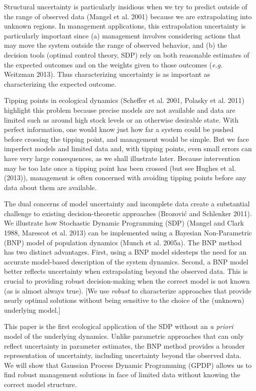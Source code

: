 \documentclass[author-year, 12pt,review]{components/elsarticle} %
\begin{document}
Structural uncertainty is particularly insidious when we try to predict
outside of the range of observed data (Mangel et al. 2001) because we
are extrapolating into unknown regions. In management applications, this
extrapolation uncertainty is particularly important since (a) management
involves considering actions that may move the system outside the range
of observed behavior, and (b) the decision tools (optimal control
theory, SDP) rely on both reasonable estimates of the expected outcomes
and on the weights given to those outcomes (\emph{e.g.} Weitzman 2013).
Thus characterizing uncertainty is as important as characterizing the
expected outcome.

Tipping points in ecological dynamics (Scheffer et al. 2001, Polasky et
al. 2011) highlight this problem because precise models are not
available and data are limited such as around high stock levels or an
otherwise desirable state. With perfect information, one would know just
how far a system could be pushed before crossing the tipping point, and
management would be simple. But we face imperfect models and limited
data and, with tipping points, even small errors can have very large
consequences, as we shall illustrate later. Because intervention may be
too late once a tipping point has been crossed (but see Hughes et al.
(2013)), management is often concerned with avoiding tipping points
before any data about them are available.

The dual concerns of model uncertainty and incomplete data create a
substantial challenge to existing decision-theoretic approaches
(Brozović and Schlenker 2011). We illustrate how Stochastic Dynamic
Programming (SDP) (Mangel and Clark 1988, Marescot et al. 2013) can be
implemented using a Bayesian Non-Parametric (BNP) model of population
dynamics (Munch et al. 2005a). The BNP method has two distinct
advantages. First, using a BNP model sidesteps the need for an accurate
model-based description of the system dynamics. Second, a BNP model
better reflects uncertainty when extrapolating beyond the observed data.
This is crucial to providing robust decision-making when the correct
model is not known (as is almost always true). {[}We use \emph{robust}
to characterize approaches that provide nearly optimal solutions without
being sensitive to the choice of the (unknown) underlying model.{]}

This paper is the first ecological application of the SDP without an
\emph{a priori} model of the underlying dynamics. Unlike parametric
approaches that can only reflect uncertainty in parameter estimates, the
BNP method provides a broader representation of uncertainty, including
uncertainty beyond the observed data. We will show that Gaussian Process
Dynamic Programming (GPDP) allows us to find robust management solutions
in face of limited data without knowing the correct model structure.
\end{document}
